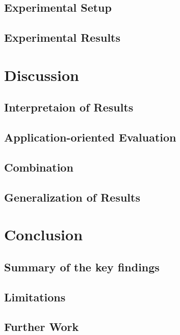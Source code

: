 \documentclass{article}
\begin{document}
\subsection{Experimental Setup}
\subsection{Experimental Results}

\section{Discussion}
\subsection{Interpretaion of Results}
\subsection{Application-oriented Evaluation}
\subsection{Combination}
\subsection{Generalization of Results}

\section{Conclusion}
\subsection{Summary of the key findings}
\subsection{Limitations}
\subsection{Further Work}






\appendix
\end{document}
